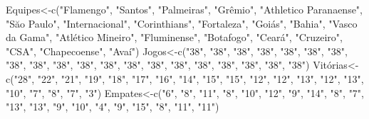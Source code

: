 \documentclass[
]{book}
\newenvironment{Shaded}{\begin{snugshade}}{\end{snugshade}}
\newcommand{\FunctionTok}[1]{\textcolor[rgb]{0.00,0.00,0.00}{#1}}
\newcommand{\NormalTok}[1]{#1}
\newcommand{\OtherTok}[1]{\textcolor[rgb]{0.56,0.35,0.01}{#1}}
\newcommand{\StringTok}[1]{\textcolor[rgb]{0.31,0.60,0.02}{#1}}
\begin{document}
\begin{Shaded}
\begin{Highlighting}[]
\NormalTok{Equipes}\OtherTok{\textless{}{-}}\FunctionTok{c}\NormalTok{(}\StringTok{"Flamengo"}\NormalTok{,  }\StringTok{"Santos"}\NormalTok{,   }\StringTok{"Palmeiras"}\NormalTok{,    }\StringTok{"Grêmio"}\NormalTok{,   }\StringTok{"Athletico Paranaense"}\NormalTok{, }\StringTok{"Săo Paulo"}\NormalTok{,    }\StringTok{"Internacional"}\NormalTok{,    }\StringTok{"Corinthians"}\NormalTok{,  }\StringTok{"Fortaleza"}\NormalTok{,    }\StringTok{"Goiás"}\NormalTok{,    }\StringTok{"Bahia"}\NormalTok{,    }\StringTok{"Vasco da Gama"}\NormalTok{,    }\StringTok{"Atlético Mineiro"}\NormalTok{, }\StringTok{"Fluminense"}\NormalTok{,   }\StringTok{"Botafogo"}\NormalTok{, }\StringTok{"Ceará"}\NormalTok{,    }\StringTok{"Cruzeiro"}\NormalTok{, }\StringTok{"CSA"}\NormalTok{,  }\StringTok{"Chapecoense"}\NormalTok{,  }\StringTok{"Avaí"}\NormalTok{)}
\NormalTok{Jogos}\OtherTok{\textless{}{-}}\FunctionTok{c}\NormalTok{(}\StringTok{"38"}\NormalTok{,  }\StringTok{"38"}\NormalTok{,   }\StringTok{"38"}\NormalTok{,   }\StringTok{"38"}\NormalTok{,   }\StringTok{"38"}\NormalTok{,   }\StringTok{"38"}\NormalTok{,   }\StringTok{"38"}\NormalTok{,   }\StringTok{"38"}\NormalTok{,   }\StringTok{"38"}\NormalTok{,   }\StringTok{"38"}\NormalTok{,   }\StringTok{"38"}\NormalTok{,   }\StringTok{"38"}\NormalTok{,   }\StringTok{"38"}\NormalTok{,   }\StringTok{"38"}\NormalTok{,   }\StringTok{"38"}\NormalTok{,   }\StringTok{"38"}\NormalTok{,   }\StringTok{"38"}\NormalTok{,   }\StringTok{"38"}\NormalTok{,   }\StringTok{"38"}\NormalTok{,   }\StringTok{"38"}\NormalTok{)}
\NormalTok{Vitórias}\OtherTok{\textless{}{-}}\FunctionTok{c}\NormalTok{(}\StringTok{"28"}\NormalTok{,   }\StringTok{"22"}\NormalTok{,   }\StringTok{"21"}\NormalTok{,   }\StringTok{"19"}\NormalTok{,   }\StringTok{"18"}\NormalTok{,   }\StringTok{"17"}\NormalTok{,   }\StringTok{"16"}\NormalTok{,   }\StringTok{"14"}\NormalTok{,   }\StringTok{"15"}\NormalTok{,   }\StringTok{"15"}\NormalTok{,   }\StringTok{"12"}\NormalTok{,   }\StringTok{"12"}\NormalTok{,   }\StringTok{"13"}\NormalTok{,   }\StringTok{"12"}\NormalTok{,   }\StringTok{"13"}\NormalTok{,   }\StringTok{"10"}\NormalTok{,   }\StringTok{"7"}\NormalTok{,    }\StringTok{"8"}\NormalTok{,    }\StringTok{"7"}\NormalTok{,    }\StringTok{"3"}\NormalTok{)}
\NormalTok{Empates}\OtherTok{\textless{}{-}}\FunctionTok{c}\NormalTok{(}\StringTok{"6"}\NormalTok{, }\StringTok{"8"}\NormalTok{,    }\StringTok{"11"}\NormalTok{,   }\StringTok{"8"}\NormalTok{,    }\StringTok{"10"}\NormalTok{,   }\StringTok{"12"}\NormalTok{,   }\StringTok{"9"}\NormalTok{,    }\StringTok{"14"}\NormalTok{,   }\StringTok{"8"}\NormalTok{,    }\StringTok{"7"}\NormalTok{,    }\StringTok{"13"}\NormalTok{,   }\StringTok{"13"}\NormalTok{,   }\StringTok{"9"}\NormalTok{,    }\StringTok{"10"}\NormalTok{,   }\StringTok{"4"}\NormalTok{,    }\StringTok{"9"}\NormalTok{,    }\StringTok{"15"}\NormalTok{,   }\StringTok{"8"}\NormalTok{,    }\StringTok{"11"}\NormalTok{,   }\StringTok{"11"}\NormalTok{)}

\end{Highlighting}
\end{Shaded}
\end{document}

